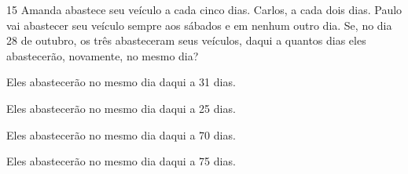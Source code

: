 




\num{15} Amanda abastece seu veículo a cada cinco dias. Carlos, a cada dois dias.
Paulo vai abastecer seu veículo sempre aos sábados e em nenhum outro
dia. Se, no dia 28 de outubro, os três abasteceram seus veículos, daqui a
quantos dias eles abastecerão, novamente, no mesmo dia?

\begin{escolha}
\item Eles abastecerão no mesmo dia daqui a 31 dias.
\item Eles abastecerão no mesmo dia daqui a 25 dias.
\item Eles abastecerão no mesmo dia daqui a 70 dias.
\item Eles abastecerão no mesmo dia daqui a 75 dias.
\end{escolha}







